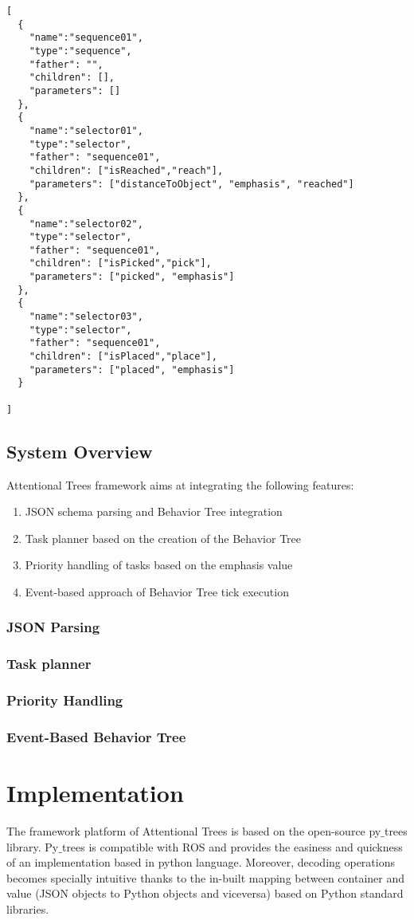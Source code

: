 \documentclass[10pt,a4paper]{article}
\begin{document}
\begin{verbatim}
[
  {
    "name":"sequence01",
    "type":"sequence",
    "father": "",
    "children": [],
    "parameters": []
  },
  {
    "name":"selector01",
    "type":"selector",
    "father": "sequence01",
    "children": ["isReached","reach"],
    "parameters": ["distanceToObject", "emphasis", "reached"]
  },
  {
    "name":"selector02",
    "type":"selector",
    "father": "sequence01",
    "children": ["isPicked","pick"],
    "parameters": ["picked", "emphasis"]
  },
  {
    "name":"selector03",
    "type":"selector",
    "father": "sequence01",
    "children": ["isPlaced","place"],
    "parameters": ["placed", "emphasis"]
  }

]
\end{verbatim}




\subsection*{System Overview}
Attentional Trees framework aims at integrating the following features:
\begin{enumerate}
\item JSON schema parsing and Behavior Tree integration
\item Task planner based on the creation of the Behavior Tree
\item Priority handling of tasks based on the emphasis value
\item Event-based approach of Behavior Tree tick execution
\end{enumerate}
\subsubsection*{JSON Parsing}
\subsubsection*{Task planner}
\subsubsection*{Priority Handling}
\subsubsection*{Event-Based Behavior Tree}
\section*{Implementation}
The framework platform of Attentional Trees is based on the open-source py$\_$trees library. Py$\_$trees is compatible with ROS and provides the easiness and quickness of an implementation based in python language. Moreover, decoding operations becomes specially intuitive thanks to the in-built mapping between container and value (JSON objects to Python objects and viceversa) based on Python standard libraries.
\end{document}
